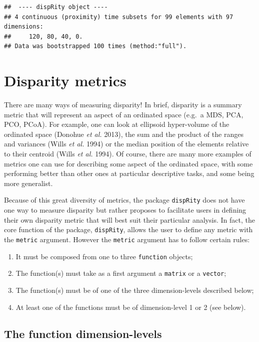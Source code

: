 \documentclass[]{book}
\providecommand{\tightlist}{%
  \setlength{\itemsep}{0pt}\setlength{\parskip}{0pt}}
\theoremstyle{definition}
\theoremstyle{definition}
\theoremstyle{definition}
\theoremstyle{remark}
\begin{document}
\begin{verbatim}
##  ---- dispRity object ---- 
## 4 continuous (proximity) time subsets for 99 elements with 97 dimensions:
##     120, 80, 40, 0.
## Data was bootstrapped 100 times (method:"full").
\end{verbatim}

\hypertarget{disparity-metrics}{\section{Disparity
metrics}\label{disparity-metrics}}

There are many ways of measuring disparity! In brief, disparity is a
summary metric that will represent an aspect of an ordinated space
(e.g.~a MDS, PCA, PCO, PCoA). For example, one can look at ellipsoid
hyper-volume of the ordinated space (Donohue \emph{et al.} 2013), the
sum and the product of the ranges and variances (Wills \emph{et al.}
1994) or the median position of the elements relative to their centroid
(Wills \emph{et al.} 1994). Of course, there are many more examples of
metrics one can use for describing some aspect of the ordinated space,
with some performing better than other ones at particular descriptive
tasks, and some being more generalist.

Because of this great diversity of metrics, the package
\texttt{dispRity} does not have one way to measure disparity but rather
proposes to facilitate users in defining their own disparity metric that
will best suit their particular analysis. In fact, the core function of
the package, \texttt{dispRity}, allows the user to define any metric
with the \texttt{metric} argument. However the \texttt{metric} argument
has to follow certain rules:

\begin{enumerate}
\def\labelenumi{\arabic{enumi}.}
\tightlist
\item
  It must be composed from one to three \texttt{function} objects;
\item
  The function(s) must take as a first argument a \texttt{matrix} or a
  \texttt{vector};
\item
  The function(s) must be of one of the three dimension-levels described
  below;
\item
  At least one of the functions must be of dimension-level 1 or 2 (see
  below).
\end{enumerate}

\subsection{The function
dimension-levels}\label{the-function-dimension-levels}
\end{document}
